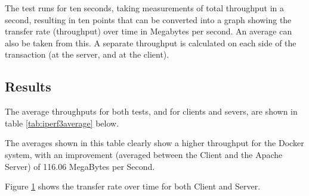 The test runs for ten seconds, taking measurements of total throughput in a second, resulting in ten points that can be converted into a graph showing the transfer rate (throughput) over time in Megabytes per second. An average can also be taken from this. A separate throughput is calculated on each side of the transaction (at the server, and at the client).
 
\subsection{Results}
\label{test1results}
The average throughputs for both tests, and for clients and severs, are shown in table \ref{tab:iperf3average} below.

\begin{table}[h]
\centering
\caption{Table showing the average transfer rate in a 10 second period}
\label{tab:iperf3average}
\end{table}

The averages shown in this table clearly show a higher throughput for the Docker system, with an improvement (averaged between the Client and the Apache Server) of 116.06 MegaBytes per Second.

Figure \ref{fig:test1graphs} shows the transfer rate over time for both Client and Server.

\begin{figure}[H]
\caption{}
\label{fig:test1graphs}
\centering
\end{figure}

